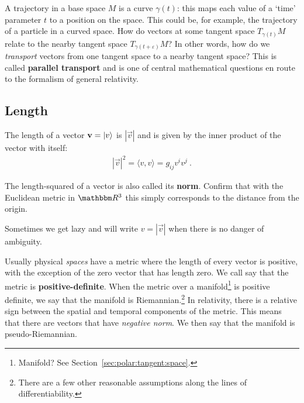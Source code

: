 \documentclass[12pt]{article}
\begin{document}
\begin{example}
A trajectory in a base space $M$ is a curve $\gamma(t)$: this maps each value of a `time' parameter $t$ to a position on the space. This could be, for example, the trajectory of a particle in a curved space. How do vectors at some tangent space $T_{\gamma(t)}M$ relate to the nearby tangent space $T_{\gamma(t+\varepsilon)}M$? In other words, how do we \emph{transport} vectors from one tangent space to a nearby tangent space? This is called \textbf{parallel transport} and is one of central mathematical questions en route to the formalism of general relativity.
\end{example}



\subsection{Length}

The length of a vector $\mathbf{v} = \left|v\right\rangle$ is $|\vec{v}|$ and is given by the inner product of the vector with itself:
\begin{align}
    |\vec{v}|^2 = \langle v, v \rangle  = g_{ij}v^iv^j \ .
\end{align}
\begin{exercise}
The length-squared of a vector is also called its \textbf{norm}.
Confirm that with the Euclidean metric in $\RR^3$ this simply corresponds to the distance from the origin.
\end{exercise}
Sometimes we get lazy and will write $v = |\vec{v}|$ when there is no danger of ambiguity. 

\begin{bigidea}
Usually physical \emph{spaces} have a metric where the length of every vector is positive, with the exception of the zero vector that has length zero. We call say that the metric is \textbf{positive-definite}. When the metric over a manifold\footnote{Manifold? See Section~\ref{sec:polar:tangent:space}.}  is positive definite, we say that the manifold is Riemannian.\footnote{There are a few other reasonable assumptions along the lines of differentiability.} In relativity, there is a relative sign between the spatial and temporal components of the metric. This means that there are vectors that have \emph{negative norm}. We then say that the manifold is pseudo-Riemannian. 
\end{bigidea}
\end{document}
